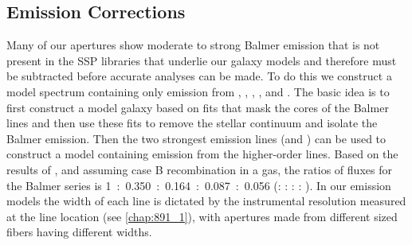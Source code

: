 

\subsection{Emission Corrections}
\label{891_2:sec:emission_corr}

Many of our apertures show moderate to strong Balmer emission that is
not present in the SSP libraries that underlie our galaxy models and
therefore must be subtracted before accurate analyses can be made. To
do this we construct a model spectrum containing only emission from
\Ha, \HB, \Hg, \Hd, and \He.  The basic idea is to first construct a
model galaxy based on fits that mask the cores of the Balmer lines and
then use these fits to remove the stellar continuum and isolate the
Balmer emission. Then the two strongest emission lines (\Ha and \HB)
can be used to construct a model containing emission from the
higher-order lines.  Based on the results of \citet{Osterbrock89}, and
assuming case B recombination in a  gas, the ratios of
fluxes for the Balmer series is \mbox{1 : 0.350 : 0.164 : 0.087 :
  0.056} (\Ha : \HB : \Hg : \Hd : \He). In our emission models the
width of each line is dictated by the instrumental resolution measured
at the line location (see \ref{chap:891_1}), with apertures
made from different sized \GP fibers having different widths.

